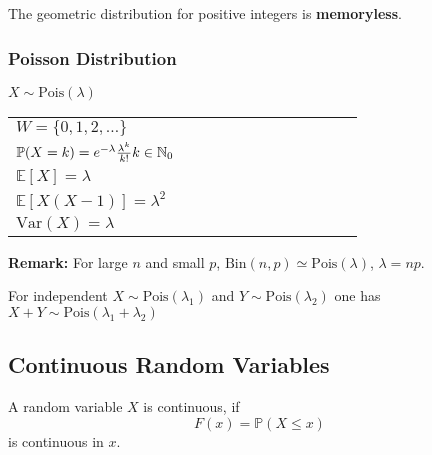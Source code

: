 \renewcommand{\arraystretch}{1}
\setlength\tabcolsep{\oldtabcolsep}

The geometric distribution for positive integers is \textbf{memoryless}.

\subsubsection{Poisson Distribution}
$X \sim \mathrm{Pois}(\lambda)$

\renewcommand{\arraystretch}{1.3}
\setlength{\oldtabcolsep}{\tabcolsep}\setlength\tabcolsep{3pt}
\begin{tabularx}{\linewidth}{@{}p{0.5\linewidth}p{0.49\linewidth}@{}}
    $W=\{0,1,2,\ldots\}$                                                        &
    \multirow{4}{*}{
        
    }                                                                             \\
    $\mathbb{P}(X=k)=e^{-\lambda}\frac{\lambda^k}{k!}\newline k\in\mathbb{N}_0$ & \\
    $\mathbb{E}[X] = \lambda$                                                   & \\
    $\mathbb{E}[X(X-1)] = \lambda^2$                                            & \\
    $\mathrm{Var}(X) = \lambda$                                                 &
\end{tabularx}
\renewcommand{\arraystretch}{1}
\setlength\tabcolsep{\oldtabcolsep}
\textbf{Remark:} For large $n$ and small $p$, $\mathrm{Bin}(n,p)\simeq \mathrm{Pois}(\lambda)$, $\lambda=np$.

For independent $X \sim \mathrm{Pois}(\lambda_1)$ and $Y \sim \mathrm{Pois}(\lambda_2)$ one has $X+Y \sim \mathrm{Pois}(\lambda_1 +\lambda_2)$

\subsection{Continuous Random Variables}
A random variable $X$ is continuous, if
\noindent\begin{equation*}
    F(x)=\mathbb{P}(X\leq x)
\end{equation*}
is continuous in $x$.


